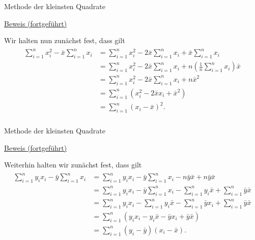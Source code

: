\documentclass[
  8pt,
  ignorenonframetext,
]{beamer}
\begin{document}
\begin{frame}{Methode der kleinsten Quadrate}
\protect\hypertarget{methode-der-kleinsten-quadrate-11}{}
\tiny
\vspace{2mm}
\setlength{\abovedisplayskip}{3pt}
\setlength{\belowdisplayskip}{3pt}

\underline{Beweis (fortgeführt)}

Wir halten nun zunächst fest, dass gilt \begin{align}
\begin{split}
\sum_{i=1}^n x_i^2  - \bar{x}\sum_{i=1}^n x_i
& = \sum_{i=1}^n x_i^2 - 2\bar{x}\sum_{i=1}^n x_i + \bar{x}\sum_{i=1}^n x_i \\
& = \sum_{i=1}^n x_i^2 - 2\bar{x}\sum_{i=1}^n x_i + n\left(\frac{1}{n}\sum_{i=1}^n x_i\right)\bar{x} \\
& = \sum_{i=1}^n x_i^2 - 2\bar{x}\sum_{i=1}^n x_i + n\bar{x}^2 \\
& = \sum_{i=1}^n \left(x_i^2 - 2\bar{x} x_i + \bar{x}^2\right) \\
& = \sum_{i=1}^n \left(x_i - \bar{x}\right)^2. \\
\end{split}
\end{align}
\end{frame}

\begin{frame}{Methode der kleinsten Quadrate}
\protect\hypertarget{methode-der-kleinsten-quadrate-12}{}
\tiny
\vspace{2mm}
\setlength{\abovedisplayskip}{3pt}
\setlength{\belowdisplayskip}{3pt}

\underline{Beweis (fortgeführt)}

Weiterhin halten wir zunächst fest, dass gilt \begin{align}
\begin{split}
\sum_{i=1}^n y_ix_i - \bar{y}\sum_{i=1}^n x_i 
& = \sum_{i=1}^n y_ix_i - \bar{y}\sum_{i=1}^n x_i - n\bar{y}\bar{x} + n\bar{y}\bar{x}                       \\
& = \sum_{i=1}^n y_ix_i - \bar{y}\sum_{i=1}^n x_i - \sum_{i=1}^n y_i\bar{x}  + \sum_{i=1}^n\bar{y}\bar{x}   \\
& = \sum_{i=1}^n y_ix_i - \sum_{i=1}^n y_i\bar{x} - \sum_{i=1}^n\bar{y} x_i  + \sum_{i=1}^n\bar{y}\bar{x}   \\
& = \sum_{i=1}^n \left(y_ix_i -  y_i\bar{x} - \bar{y} x_i  + \bar{y}\bar{x}\right)                          \\
& = \sum_{i=1}^n \left(y_i-\bar{y}\right)\left(x_i-\bar{x}\right).
\end{split}
\end{align}
\end{frame}
\end{document}
